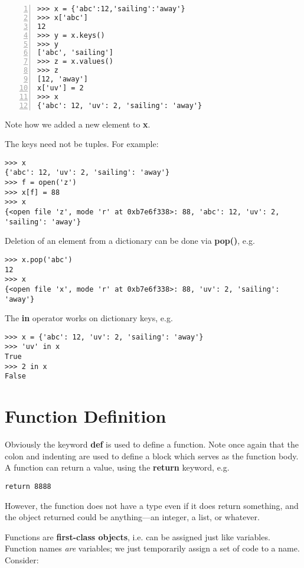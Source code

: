 \begin{Verbatim}[fontsize=\relsize{-2},numbers=left]
>>> x = {'abc':12,'sailing':'away'}
>>> x['abc']
12
>>> y = x.keys()
>>> y
['abc', 'sailing']
>>> z = x.values()
>>> z
[12, 'away']
x['uv'] = 2
>>> x
{'abc': 12, 'uv': 2, 'sailing': 'away'}
\end{Verbatim} 

Note how we added a new element to {\bf x}.

The keys need not be tuples.  For example:

\begin{Verbatim}[fontsize=\relsize{-2}]
>>> x
{'abc': 12, 'uv': 2, 'sailing': 'away'}
>>> f = open('z')
>>> x[f] = 88
>>> x
{<open file 'z', mode 'r' at 0xb7e6f338>: 88, 'abc': 12, 'uv': 2, 'sailing': 'away'}
\end{Verbatim}

Deletion of an element from a dictionary can be done via {\bf pop()}, e.g.

\begin{Verbatim}[fontsize=\relsize{-2}]
>>> x.pop('abc')
12
>>> x
{<open file 'x', mode 'r' at 0xb7e6f338>: 88, 'uv': 2, 'sailing': 'away'}
\end{Verbatim}

The {\bf in} operator works on dictionary keys, e.g.

\begin{Verbatim}[fontsize=\relsize{-2}]
>>> x = {'abc': 12, 'uv': 2, 'sailing': 'away'}
>>> 'uv' in x
True
>>> 2 in x
False
\end{Verbatim}

\section{Function Definition}

Obviously the keyword {\bf def} is used to define a function.  Note once
again that the colon and indenting are used to define a block which
serves as the function body.  A function can return a value, using the
{\bf return} keyword, e.g.

\begin{Verbatim}[fontsize=\relsize{-2}]
return 8888
\end{Verbatim}

However, the function does not have a type even if it does return
something, and the object returned could be anything---an integer, a
list, or whatever.

Functions are {\bf first-class objects}, i.e. can be assigned just like
variables.  Function names {\it are} variables; we just temporarily
assign a set of code to a name.  Consider:

